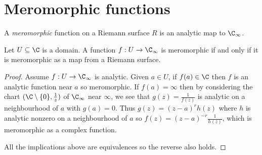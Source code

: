 \documentclass[a4paper]{article}
\begin{document}

\section{Meromorphic functions}

\begin{definition}[meromorphic]
  A \emph{meromorphic} function on a Riemann surface \(R\) is an analytic map to \(\C_\infty\).
\end{definition}

\begin{proposition}
  Let \(U \subseteq \C\) is a domain. A function \(f: U \to \C_\infty\) is meromorphic if and only if it is meromorphic as a map from a Riemann surface.
\end{proposition}

\begin{proof}
  Assume \(f: U \to \C_\infty\) is analytic. Given \(a \in U\), if \(f(a) \in \C\) then \(f\) is an analytic function near \(a\) so meromorphic. If \(f(a) = \infty\) then by considering the chart \((\C \setminus \{0\}, \frac{1}{z})\) of \(\C_\infty\) near \(\infty\), we see that \(g(z) = \frac{1}{f(z)}\) is analytic on a neighbourhood of \(a\) with \(g(a) = 0\). Thus \(g(z) = (z - a)^r h(z)\) where \(h\) is analytic nonzero on a neighbourhood of \(a\) so \(f(z) = (z - a)^{-r} \frac{1}{h(z)}\), which is meromorphic as a complex function.

  All the implications above are equivalences so the reverse also holds.
\end{proof}
\end{document}
